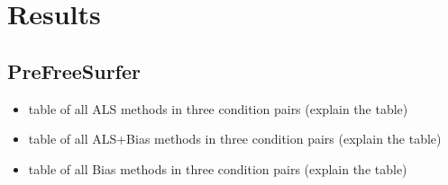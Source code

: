 \chapter{Results}
\section{PreFreeSurfer}
\begin{tcolorbox}
	\begin{itemize}
		\item table of all ALS methods in three condition pairs (explain the table)
		\item table of all ALS+Bias methods in three condition pairs (explain the table)
		\item table of all Bias methods in three condition pairs (explain the table)
\end{itemize}
\end{tcolorbox}
